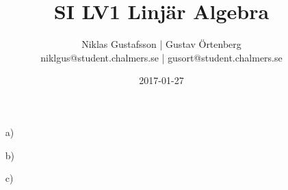 \documentclass{article}
\title{SI LV1 Linjär Algebra}
\author{Niklas Gustafsson | Gustav Örtenberg  \\ \small{niklgus@student.chalmers.se} | \small{gusort@student.chalmers.se}}
\date{2017-01-27}
\begin{document}
\maketitle
\section{}


\section{}
\begin{itemize}
\item[a) ] 
\item[b) ] 
\item[c) ] 
\end{itemize}

\section{}


\section{}

\end{document}
